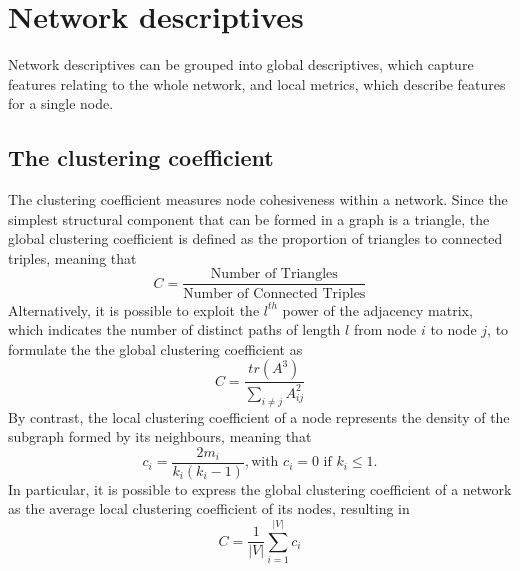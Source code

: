 \documentclass{report}
\begin{document}
\section{Network descriptives}
Network descriptives can be grouped into global descriptives, which capture features relating to the whole network, and local metrics, which describe features for a single node.
\subsection{The clustering coefficient}
The clustering coefficient measures node cohesiveness within a network. \newline
Since the simplest structural component that can be formed in a graph is a triangle, the global clustering coefficient is defined as the proportion of triangles to connected triples, meaning that
\[C = \frac{\text{Number of Triangles}}{\text{Number of Connected Triples}}\]
Alternatively, it is possible to exploit the $\displaystyle l^{th}$ power of the adjacency matrix, which indicates the number of distinct paths of length $\displaystyle l$ from node $\displaystyle i$ to node $\displaystyle j$, to formulate the the global clustering coefficient as
\[C = \frac{tr(A^3)}{\sum_{i \neq j} A_{ij}^2}\]
By contrast, the local clustering coefficient of a node represents the density of the subgraph formed by its neighbours, meaning that
\[c_i = \frac{2m_i}{k_i(k_i - 1)}, \text{with $c_i = 0$ if $k_i \leq 1$.}\]
In particular, it is possible to express the global clustering coefficient of a network as the average local clustering coefficient of its nodes, resulting in
\[C = \frac{1}{|V|}\sum_{i=1}^{|V|} c_i\]
\end{document}
